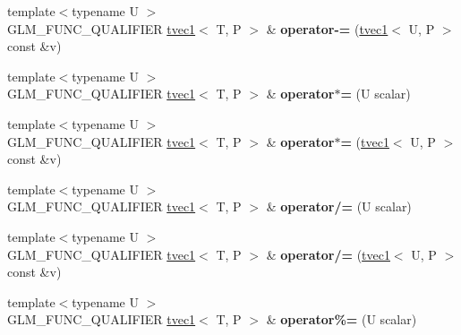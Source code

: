 \begin{DoxyCompactItemize}
\item 
\mbox{\label{structglm_1_1tvec1_adda6b97039322228b22bae46dc2412f2}} 
{\footnotesize template$<$typename U $>$ }\\G\+L\+M\+\_\+\+F\+U\+N\+C\+\_\+\+Q\+U\+A\+L\+I\+F\+I\+ER \hyperlink{structglm_1_1tvec1}{tvec1}$<$ T, P $>$ \& {\bfseries operator-\/=} (\hyperlink{structglm_1_1tvec1}{tvec1}$<$ U, P $>$ const \&v)
\item 
\mbox{\label{structglm_1_1tvec1_a65205ade3eaa4bf1ae4f3b3804ea080a}} 
{\footnotesize template$<$typename U $>$ }\\G\+L\+M\+\_\+\+F\+U\+N\+C\+\_\+\+Q\+U\+A\+L\+I\+F\+I\+ER \hyperlink{structglm_1_1tvec1}{tvec1}$<$ T, P $>$ \& {\bfseries operator$\ast$=} (U scalar)
\item 
\mbox{\label{structglm_1_1tvec1_ad4cb2d433838e6595769a4239aa5a47c}} 
{\footnotesize template$<$typename U $>$ }\\G\+L\+M\+\_\+\+F\+U\+N\+C\+\_\+\+Q\+U\+A\+L\+I\+F\+I\+ER \hyperlink{structglm_1_1tvec1}{tvec1}$<$ T, P $>$ \& {\bfseries operator$\ast$=} (\hyperlink{structglm_1_1tvec1}{tvec1}$<$ U, P $>$ const \&v)
\item 
\mbox{\label{structglm_1_1tvec1_a989f51843859422e4d4d5fe05f250a62}} 
{\footnotesize template$<$typename U $>$ }\\G\+L\+M\+\_\+\+F\+U\+N\+C\+\_\+\+Q\+U\+A\+L\+I\+F\+I\+ER \hyperlink{structglm_1_1tvec1}{tvec1}$<$ T, P $>$ \& {\bfseries operator/=} (U scalar)
\item 
\mbox{\label{structglm_1_1tvec1_ad0331e0db142714cc1169da2d209eb01}} 
{\footnotesize template$<$typename U $>$ }\\G\+L\+M\+\_\+\+F\+U\+N\+C\+\_\+\+Q\+U\+A\+L\+I\+F\+I\+ER \hyperlink{structglm_1_1tvec1}{tvec1}$<$ T, P $>$ \& {\bfseries operator/=} (\hyperlink{structglm_1_1tvec1}{tvec1}$<$ U, P $>$ const \&v)
\item 
\mbox{\label{structglm_1_1tvec1_a35dc2d42d4af7b06ce9efcf2280cfffc}} 
{\footnotesize template$<$typename U $>$ }\\G\+L\+M\+\_\+\+F\+U\+N\+C\+\_\+\+Q\+U\+A\+L\+I\+F\+I\+ER \hyperlink{structglm_1_1tvec1}{tvec1}$<$ T, P $>$ \& {\bfseries operator\%=} (U scalar)

\end{DoxyCompactItemize}
